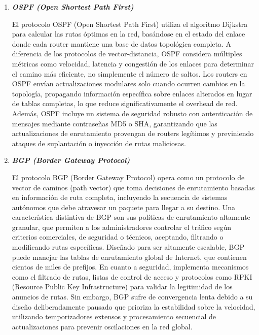 \documentclass[12pt]{amsart}
\begin{document}
\begin{enumerate}
\begin{enumerate}
						\item \textbf{\textit{OSPF (Open Shortest Path First)}}
						
						\medskip
						\noindent El protocolo OSPF (Open Shortest Path First) utiliza el algoritmo Dijkstra para calcular las rutas óptimas en la red, basándose en el estado del enlace donde cada router mantiene una base de datos topológica completa. A diferencia de los protocolos de vector-distancia, OSPF considera múltiples métricas como velocidad, latencia y congestión de los enlaces para determinar el camino más eficiente, no simplemente el número de saltos. Los routers en OSPF envían actualizaciones modulares solo cuando ocurren cambios en la topología, propagando información específica sobre enlaces alterados en lugar de tablas completas, lo que reduce significativamente el overhead de red. Además, OSPF incluye un sistema de seguridad robusto con autenticación de mensajes mediante contraseñas MD5 o SHA, garantizando que las actualizaciones de enrutamiento provengan de routers legítimos y previniendo ataques de suplantación o inyección de rutas maliciosas.

						\bigskip\bigskip

						\item \textbf{\textit{BGP (Border Gateway Protocol)}}
						
						\medskip
						\noindent El protocolo BGP (Border Gateway Protocol) opera como un protocolo de vector de caminos (path vector) que toma decisiones de enrutamiento basadas en información de ruta completa, incluyendo la secuencia de sistemas autónomos que debe atravesar un paquete para llegar a su destino. Una característica distintiva de BGP son sus políticas de enrutamiento altamente granular, que permiten a los administradores controlar el tráfico según criterios comerciales, de seguridad o técnicos, aceptando, filtrando o modificando rutas específicas. Diseñado para ser altamente escalable, BGP puede manejar las tablas de enrutamiento global de Internet, que contienen cientos de miles de prefijos. En cuanto a seguridad, implementa mecanismos como el filtrado de rutas, listas de control de acceso y protocolos como RPKI (Resource Public Key Infrastructure) para validar la legitimidad de los anuncios de rutas. Sin embargo, BGP sufre de convergencia lenta debido a su diseño deliberadamente pausado que prioriza la estabilidad sobre la velocidad, utilizando temporizadores extensos y procesamiento secuencial de actualizaciones para prevenir oscilaciones en la red global.


\end{enumerate}
\end{enumerate}
\end{document}
